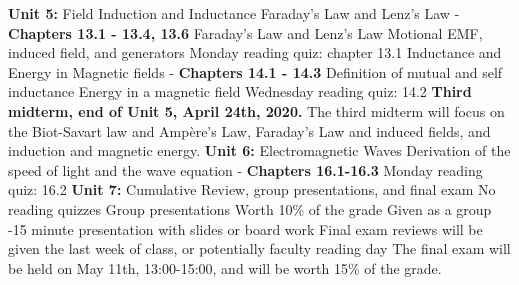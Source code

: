 \documentclass[10pt]{article}
\begin{document}
\begin{outline}[enumerate]
\1 \textbf{Unit 5:} Field Induction and Inductance
\2 Faraday's Law and Lenz's Law - \textbf{Chapters 13.1 - 13.4, 13.6}
\3 Faraday's Law and Lenz's Law
\3 Motional EMF, induced field, and generators
\3 Monday reading quiz: chapter 13.1
\2 Inductance and Energy in Magnetic fields - \textbf{Chapters 14.1 - 14.3}
\3 Definition of mutual and self inductance
\3 Energy in a magnetic field
\3 Wednesday reading quiz: 14.2
\1 \textbf{Third midterm, end of Unit 5, April 24th, 2020.} The third midterm will focus on the Biot-Savart law and Amp\`{e}re's Law, Faraday's Law and induced fields, and induction and magnetic energy.
\1 \textbf{Unit 6:} Electromagnetic Waves
\2 Derivation of the speed of light and the wave equation - \textbf{Chapters 16.1-16.3}
\2 Monday reading quiz: 16.2
\1 \textbf{Unit 7:} Cumulative Review, group presentations, and final exam
\2 No reading quizzes
\2 Group presentations
\3 Worth 10\% of the grade
\3 Given as a group
-15 minute presentation with slides or board work
\3 Final exam reviews will be given the last week of class, or potentially faculty reading day
\3 The final exam will be held on May 11th, 13:00-15:00, and will be worth 15\% of the grade.
\end{outline}
\end{document}
